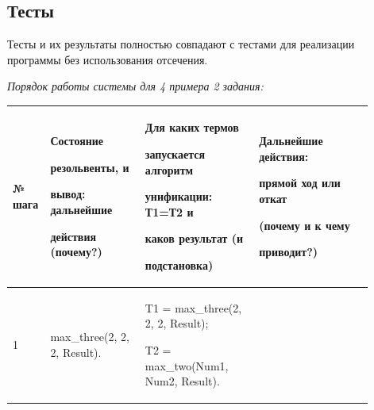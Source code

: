 \documentclass[a4paper,12pt]{article}
\begin{document}
	\newpage

	

	\subsection*{Тесты}

	

	Тесты и их результаты полностью совпадают с тестами для реализации программы без использования отсечения.

	

	\textit{Порядок работы системы для 4 примера 2 задания:}

	

	\begin{center}

		\begin{longtable}[h!]{|p{0.05\linewidth}|p{0.25\linewidth}|p{ 0.3\linewidth}|p{ 0.3\linewidth}|}

			\hline

			{№ шага} & {Состояние 

				

				резольвенты, и 

				

				вывод: дальнейшие 

				

				действия (почему?)} & {Для каких термов 

				

				запускается алгоритм 

				

				унификации: Т1=Т2 и 

				

				каков {\bf результат} (и 

				

				подстановка)} & {Дальнейшие действия: 

				

				прямой ход или откат 

				

				(почему и к чему 

				

				приводит?)}\\

			\hline

			{1} & {max\_three(2, 2, 2, Result).} & {T1 = max\_three(2, 2, 2, Result);

			

		T2 = max\_two(Num1, Num2, Result). 

		

}
\end{longtable}
\end{center}
\end{document}
